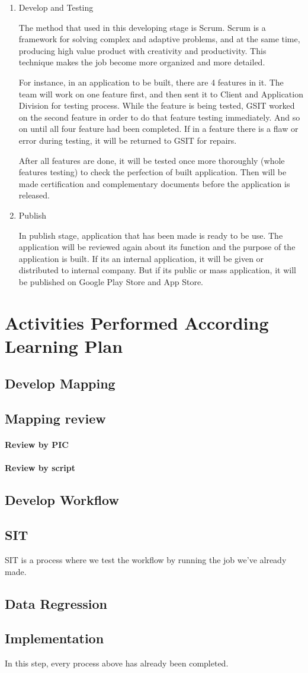 \begin{enumerate}
\item Develop and Testing

The method that used in this developing stage is Scrum. Scrum is a framework for solving complex and adaptive problems, and at the same time, producing high value product with creativity and productivity. This technique makes the job become more organized and more detailed.

For instance, in an application to be built, there are 4 features in it. The team will work on one feature first, and then sent it to Client and Application Division for testing process. While the feature is being tested, GSIT worked on the second feature in order to do that feature testing immediately. And so on until all four feature had been completed. If in a feature there is a flaw or error during testing, it will be returned to GSIT for repairs.

After all features are done, it will be tested once more thoroughly (whole features testing) to check the perfection of built application. Then will be made certification and complementary documents before the application is released.

\item Publish

In publish stage, application that has been made is ready to be use. The application will be reviewed again about its function and the purpose of the application is built. If its an internal application, it will be given or distributed to internal company. But if its public or mass application, it will be published on Google Play Store and App Store.

\end{enumerate}
\section{Activities Performed According Learning Plan}
\subsection{Develop Mapping}
\subsection{Mapping review}
\paragraph{Review by PIC}
\paragraph{Review by script}
\subsection{Develop Workflow}
\subsection{SIT}
SIT is a process where we test the workflow by running the job we've already made.
\subsection{Data Regression}
\subsection{Implementation}
In this step, every process above has already been completed.